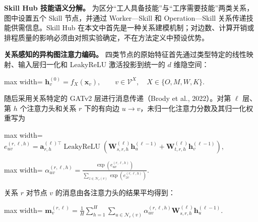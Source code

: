 \documentclass[journal,10pt]{IEEEtran}
\begin{document}
\textbf{Skill Hub 技能语义分解。} 为区分``工人具备技能''与``工序需要技能''两类关系，图中设置五个 Skill 节点，并通过 Worker---Skill 和 Operation---Skill 关系传递技能供需信息。Skill Hub 在本文中首先是一种关系建模机制；对边数、计算开销或排程质量的影响必须由对照实验确定，不在方法定义中预设优势。

\textbf{关系感知的异构图注意力编码。} 四类节点的原始特征首先通过类型特定的线性映射、输入层归一化和 LeakyReLU 激活投影到统一的 \(d\) 维隐空间：

\begin{center}
\begin{adjustbox}{max width=\columnwidth}
$\displaystyle
\mathbf h_v^{(0)}=f_X(\mathbf x_v),
\qquad v\in\mathcal{V}^{X},
\quad X\in\{O,M,W,K\}.
$
\end{adjustbox}
\end{center}

随后采用关系特定的 GATv2 层进行消息传递（Brody et al., 2022）。对第 \(\ell\) 层、第 \(h\) 个注意力头和关系 \(r\) 下的有向边 \(u\rightarrow v\)，未归一化注意力分数及其归一化权重写为

\begin{center}
\begin{adjustbox}{max width=\columnwidth}
$\displaystyle
e_{uv}^{(r,\ell,h)}=
\mathbf a_{r,h}^{(\ell)\top}
\operatorname{LeakyReLU}\!\left(
\mathbf W_{s,r,h}^{(\ell)}\mathbf h_u^{(\ell-1)}
+\mathbf W_{t,r,h}^{(\ell)}\mathbf h_v^{(\ell-1)}
\right),
$
\end{adjustbox}
\end{center}

\begin{center}
\begin{adjustbox}{max width=\columnwidth}
$\displaystyle
\alpha_{uv}^{(r,\ell,h)}=
\frac{\exp\!\left(e_{uv}^{(r,\ell,h)}\right)}
{\displaystyle\sum_{z\in\mathcal N_r(v)}
\exp\!\left(e_{zv}^{(r,\ell,h)}\right)}.
$
\end{adjustbox}
\end{center}

关系 \(r\) 对节点 \(v\) 的消息由各注意力头的结果平均得到：

\begin{center}
\begin{adjustbox}{max width=\columnwidth}
$\displaystyle
\mathbf m_v^{(r,\ell)}=
\frac{1}{H}\sum_{h=1}^{H}
\sum_{u\in\mathcal N_r(v)}
\alpha_{uv}^{(r,\ell,h)}
\mathbf W_{s,r,h}^{(\ell)}\mathbf h_u^{(\ell-1)}.
$
\end{adjustbox}
\end{center}
\end{document}
